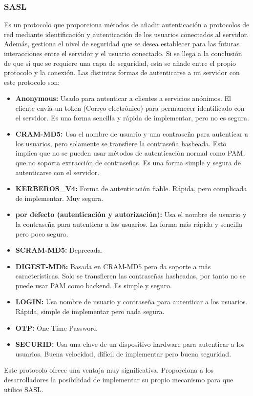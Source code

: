 \documentclass[titlepage]{article}
\begin{document}
\subsubsection{\Gls{SASL}}
Es un protocolo que proporciona métodos de añadir autenticación a protocolos de red mediante identificación y autenticación de los usuarios conectados al servidor. Además, gestiona el nivel de seguridad que se desea establecer para las futuras interacciones entre el servidor y el usuario conectado. Si se llega a la conclusión de que si que se requiere una capa de seguridad, esta se añade entre el propio protocolo y la conexión.\cite{rfc2222} 
Las distintas formas de autenticarse a un servidor con este protocolo son:
\begin{itemize}
	\item{\textbf{Anonymous: }}Usado para autenticar a clientes a servicios anónimos. El cliente envía un token (Correo electrónico) para permanecer identificado con el servidor. Es una forma sencilla y rápida de implementar, pero no es segura.
	\item{\textbf{CRAM-MD5: }}Usa el nombre de usuario y una contraseña para autenticar a los usuarios, pero solamente se transfiere la contraseña hasheada. Esto implica que no se pueden usar métodos de autenticación normal como \Gls{PAM}, que no soporta extracción de contraseñas. Es una forma simple y segura de autenticarse con el servidor.
	\item{\textbf{KERBEROS\_V4: }}Forma de autenticación fiable. Rápida, pero complicada de implementar. Muy segura.
	\item{\textbf{por defecto (autenticación y autorización): }}Usa el nombre de usuario y la contraseña para autenticar a los usuarios. La forma más rápida y sencilla pero poco segura.
	\item{\textbf{SCRAM-MD5: }}Deprecada.
	\item{\textbf{DIGEST-MD5: }}Basada en CRAM-MD5 pero da soporte a más características. Solo se transfieren las contraseñas hasheadas, por tanto no se puede usar \Gls{PAM} como backend. Es simple y seguro.
	\item{\textbf{LOGIN: }}Usa nombre de usuario y contraseña para autenticar a los usuarios. Rápida, simple de implementar pero nada segura.
	\item{\textbf{OTP: }}One Time Password
	\item{\textbf{SECURID: }}Usa una clave de un dispositivo hardware para autenticar a los usuarios. Buena velocidad, difícil de implementar pero buena seguridad.
\end{itemize}
Este protocolo ofrece una ventaja muy significativa. Proporciona a los desarrolladores la posibilidad de implementar su propio mecanismo para que utilice SASL.
\end{document}
